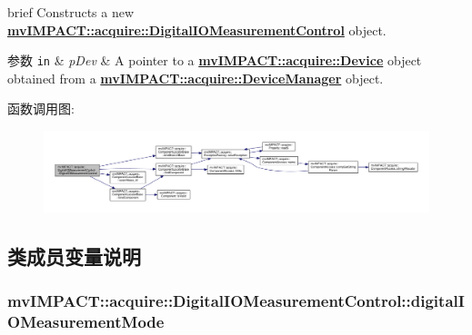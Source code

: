 brief Constructs a new {\bfseries \hyperlink{classmv_i_m_p_a_c_t_1_1acquire_1_1_digital_i_o_measurement_control}{mv\+I\+M\+P\+A\+C\+T\+::acquire\+::\+Digital\+I\+O\+Measurement\+Control}} object. 


\begin{DoxyParams}[1]{参数}
\mbox{\tt in}  & {\em p\+Dev} & A pointer to a {\bfseries \hyperlink{classmv_i_m_p_a_c_t_1_1acquire_1_1_device}{mv\+I\+M\+P\+A\+C\+T\+::acquire\+::\+Device}} object obtained from a {\bfseries \hyperlink{classmv_i_m_p_a_c_t_1_1acquire_1_1_device_manager}{mv\+I\+M\+P\+A\+C\+T\+::acquire\+::\+Device\+Manager}} object. \\
\hline
\end{DoxyParams}


函数调用图\+:
\nopagebreak
\begin{figure}[H]
\begin{center}
\leavevmode
\includegraphics[width=350pt]{classmv_i_m_p_a_c_t_1_1acquire_1_1_digital_i_o_measurement_control_a3722c740967e1e233d636ac68cb2ab7b_cgraph}
\end{center}
\end{figure}




\subsection{类成员变量说明}
\hypertarget{classmv_i_m_p_a_c_t_1_1acquire_1_1_digital_i_o_measurement_control_adbebd679b5f5c97aef82aa9bea790285}{
\subsubsection[{digital\+I\+O\+Measurement\+Mode}]{ mv\+I\+M\+P\+A\+C\+T\+::acquire\+::\+Digital\+I\+O\+Measurement\+Control\+::digital\+I\+O\+Measurement\+Mode}}\label{classmv_i_m_p_a_c_t_1_1acquire_1_1_digital_i_o_measurement_control_adbebd679b5f5c97aef82aa9bea790285}


